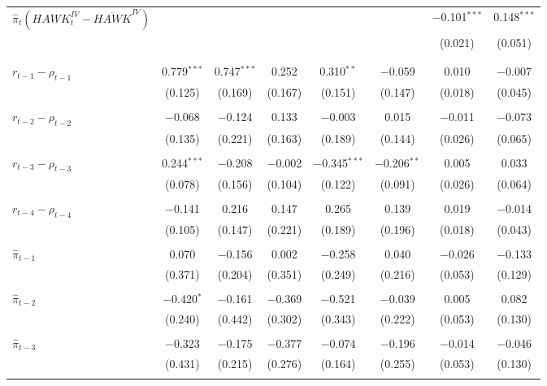 \documentclass[12pt]{article}
\numberwithin{equation}{section}
\begin{document}
\begin{table}[!htbp]
\begin{threeparttable}
\begin{tabular}{@{\extracolsep{2pt}}lccccccc}
    $\hat\pi_t \left(\mathit{HAWK}_{t}^\mathit{IV}-\overline{\mathit{HAWK}}^\mathit{IV}\right)$ &  &  &  &  &  & $-$0.101$^{***}$ & 0.148$^{***}$ \\ 
    &  &  &  &  &  & (0.021) & (0.051) \\ 
    & & & & & & \\ 
    & & & & & & \\ 
   $r_{t-1}-\rho_{t-1}$ & 0.779$^{***}$ & 0.747$^{***}$ & 0.252 & 0.310$^{**}$ & $-$0.059 & 0.010 & $-$0.007 \\ 
   & (0.125) & (0.169) & (0.167) & (0.151) & (0.147) & (0.018) & (0.045) \\ 
    & & & & & & \\ 
    $r_{t-2}-\rho_{t-2}$ & $-$0.068 & $-$0.124 & 0.133 & $-$0.003 & 0.015 & $-$0.011 & $-$0.073 \\ 
    & (0.135) & (0.221) & (0.163) & (0.189) & (0.144) & (0.026) & (0.065) \\ 
    & & & & & & \\ 
    $r_{t-3}-\rho_{t-3}$ & 0.244$^{***}$ & $-$0.208 & $-$0.002 & $-$0.345$^{***}$ & $-$0.206$^{**}$ & 0.005 & 0.033 \\ 
    & (0.078) & (0.156) & (0.104) & (0.122) & (0.091) & (0.026) & (0.064) \\ 
    & & & & & & & \\ 
    $r_{t-4}-\rho_{t-4}$ &  $-$0.141 & 0.216 & 0.147 & 0.265 & 0.139 & 0.019 & $-$0.014 \\ 
    & (0.105) & (0.147) & (0.221) & (0.189) & (0.196) & (0.018) & (0.043) \\ 
    & & & & & & \\ 
  $\hat\pi_{t-1}$ & 0.070 & $-$0.156 & 0.002 & $-$0.258 & 0.040 & $-$0.026 & $-$0.133 \\ 
  & (0.371) & (0.204) & (0.351) & (0.249) & (0.216) & (0.053) & (0.129) \\ 
    & & & & & & \\ 
    $\hat\pi_{t-2}$ & $-$0.420$^{*}$ & $-$0.161 & $-$0.369 & $-$0.521 & $-$0.039 & 0.005 & 0.082 \\ 
    & (0.240) & (0.442) & (0.302) & (0.343) & (0.222) & (0.053) & (0.130) \\ 
    & & & & & & \\ 
    $\hat\pi_{t-3}$  & $-$0.323 & $-$0.175 & $-$0.377 & $-$0.074 & $-$0.196 & $-$0.014 & $-$0.046 \\ 
    & (0.431) & (0.215) & (0.276) & (0.164) & (0.255) & (0.053) & (0.130) \\ 
    & & & & & & \\ 

\end{tabular}
\end{threeparttable}
\end{table}
\end{document}
